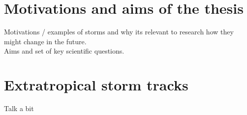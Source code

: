 \section{Motivations and aims of the thesis}
\label{chap:intro_motivations}
Motivations / examples of storms and why its relevant to research how they might change in the future.\\
Aims and set of key scientific questions.
\section{Extratropical storm tracks}
\label{chap:intro_lit_tracks}
Talk a bit

